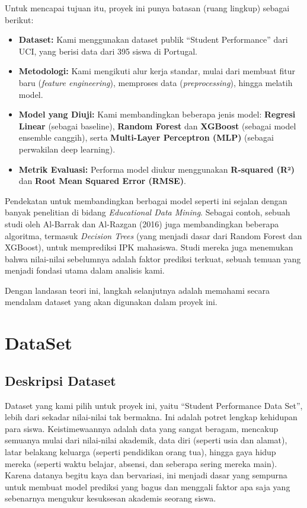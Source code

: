 Untuk mencapai tujuan itu, proyek ini punya batasan (ruang lingkup) sebagai berikut:
\begin{itemize}
    \item \textbf{Dataset:} Kami menggunakan dataset publik ``Student Performance'' dari UCI, yang berisi data dari 395 siswa di Portugal.
    \item \textbf{Metodologi:} Kami mengikuti alur kerja standar, mulai dari membuat fitur baru (\textit{feature engineering}), memproses data (\textit{preprocessing}), hingga melatih model.
    \item \textbf{Model yang Diuji:} Kami membandingkan beberapa jenis model: \textbf{Regresi Linear} (sebagai baseline), \textbf{Random Forest} dan \textbf{XGBoost} (sebagai model ensemble canggih), serta \textbf{Multi-Layer Perceptron (MLP)} (sebagai perwakilan deep learning).
    \item \textbf{Metrik Evaluasi:} Performa model diukur menggunakan \textbf{R-squared (R²)} dan \textbf{Root Mean Squared Error (RMSE)}.
\end{itemize}

Pendekatan untuk membandingkan berbagai model seperti ini sejalan dengan banyak penelitian di bidang \textit{Educational Data Mining}. Sebagai contoh, sebuah studi oleh Al-Barrak dan Al-Razgan (2016) juga membandingkan beberapa algoritma, termasuk \textit{Decision Trees} (yang menjadi dasar dari Random Forest dan XGBoost), untuk memprediksi IPK mahasiswa. Studi mereka juga menemukan bahwa nilai-nilai sebelumnya adalah faktor prediksi terkuat, sebuah temuan yang menjadi fondasi utama dalam analisis kami.


Dengan landasan teori ini, langkah selanjutnya adalah memahami secara mendalam dataset yang akan digunakan dalam proyek ini.

\chapter*{DataSet}

\section{Deskripsi Dataset}
Dataset yang kami pilih untuk proyek ini, yaitu ``Student Performance Data Set'', lebih dari sekadar nilai-nilai tak bermakna. Ini adalah potret lengkap kehidupan para siswa. Keistimewaannya adalah data yang sangat beragam, mencakup semuanya mulai dari nilai-nilai akademik, data diri (seperti usia dan alamat), latar belakang keluarga (seperti pendidikan orang tua), hingga gaya hidup mereka (seperti waktu belajar, absensi, dan seberapa sering mereka main). Karena datanya begitu kaya dan bervariasi, ini menjadi dasar yang sempurna untuk membuat model prediksi yang bagus dan menggali faktor apa saja yang sebenarnya mengukur kesuksesan akademis seorang siswa.

